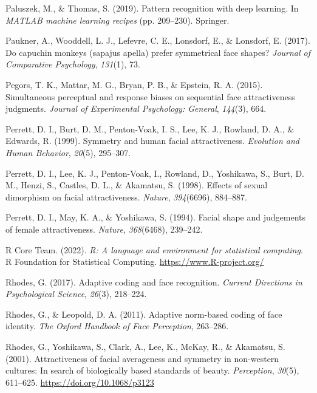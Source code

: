 \documentclass[
  man,floatsintext]{apa6}
\newlength{\cslhangindent}
\newlength{\cslentryspacingunit} %
\newenvironment{CSLReferences}[2] %
 {%
  \setlength{\parindent}{0pt}
  \ifodd #1
  \let\oldpar\par
  \def\par{\hangindent=\cslhangindent\oldpar}
  \fi
  \setlength{\parskip}{#2\cslentryspacingunit}
 }%
 {}
\begin{document}
\begin{CSLReferences}{1}{0}
\leavevmode{}%
Paluszek, M., \& Thomas, S. (2019). Pattern recognition with deep learning. In \emph{MATLAB machine learning recipes} (pp. 209--230). Springer.

\leavevmode{}%
Paukner, A., Wooddell, L. J., Lefevre, C. E., Lonsdorf, E., \& Lonsdorf, E. (2017). Do capuchin monkeys (sapajus apella) prefer symmetrical face shapes? \emph{Journal of Comparative Psychology}, \emph{131}(1), 73.

\leavevmode{}%
Pegors, T. K., Mattar, M. G., Bryan, P. B., \& Epstein, R. A. (2015). Simultaneous perceptual and response biases on sequential face attractiveness judgments. \emph{Journal of Experimental Psychology: General}, \emph{144}(3), 664.

\leavevmode{}%
Perrett, D. I., Burt, D. M., Penton-Voak, I. S., Lee, K. J., Rowland, D. A., \& Edwards, R. (1999). Symmetry and human facial attractiveness. \emph{Evolution and Human Behavior}, \emph{20}(5), 295--307.

\leavevmode{}%
Perrett, D. I., Lee, K. J., Penton-Voak, I., Rowland, D., Yoshikawa, S., Burt, D. M., Henzi, S., Castles, D. L., \& Akamatsu, S. (1998). Effects of sexual dimorphism on facial attractiveness. \emph{Nature}, \emph{394}(6696), 884--887.

\leavevmode{}%
Perrett, D. I., May, K. A., \& Yoshikawa, S. (1994). Facial shape and judgements of female attractiveness. \emph{Nature}, \emph{368}(6468), 239--242.

\leavevmode{}%
R Core Team. (2022). \emph{R: A language and environment for statistical computing}. R Foundation for Statistical Computing. \url{https://www.R-project.org/}

\leavevmode{}%
Rhodes, G. (2017). Adaptive coding and face recognition. \emph{Current Directions in Psychological Science}, \emph{26}(3), 218--224.

\leavevmode{}%
Rhodes, G., \& Leopold, D. A. (2011). Adaptive norm-based coding of face identity. \emph{The Oxford Handbook of Face Perception}, 263--286.

\leavevmode{}%
Rhodes, G., Yoshikawa, S., Clark, A., Lee, K., McKay, R., \& Akamatsu, S. (2001). Attractiveness of facial averageness and symmetry in non-western cultures: In search of biologically based standards of beauty. \emph{Perception}, \emph{30}(5), 611--625. \url{https://doi.org/10.1068/p3123}


\end{CSLReferences}
\end{document}
